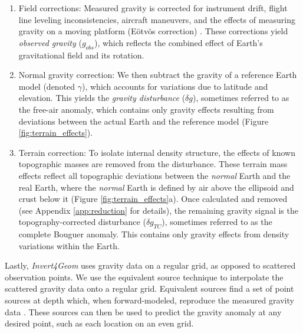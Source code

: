\documentclass[tc, manuscript]{copernicus}
\begin{document}
\begin{enumerate}
    \item Field corrections: Measured gravity is corrected for instrument drift, flight line leveling inconsistencies, aircraft maneuvers, and the effects of measuring gravity on a moving platform (E\"{o}tv\"{o}s correction) \citep{hinzenew2005, hinzegravity2013}. These corrections yield \textit{observed gravity} ($g_{obs}$), which reflects the combined effect of Earth's gravitational field and its rotation.
    \item Normal gravity correction: We then subtract the gravity of a reference Earth model (denoted $\gamma$), which accounts for variations due to latitude and elevation. This yields the \textit{gravity disturbance} ($\delta g$), sometimes referred to as the free-air anomaly, which contains only gravity effects resulting from deviations between the actual Earth and the reference model (Figure \ref{fig:terrain_effects}).
    \item Terrain correction: To isolate internal density structure, the effects of known topographic masses are removed from the disturbance. These terrain mass effects reflect all topographic deviations between the \textit{normal} Earth and the real Earth, where the \textit{normal} Earth is defined by air above the ellipsoid and crust below it (Figure \ref{fig:terrain_effects}a). Once calculated and removed (see Appendix \ref{app:reduction} for details), the remaining gravity signal is the topography-corrected disturbance ($\delta g_{TC}$), sometimes referred to as the complete Bouguer anomaly. This contains only gravity effects from density variations within the Earth.
\end{enumerate}

Lastly, \textit{Invert4Geom} uses gravity data on a regular grid, as opposed to scattered observation points. We use the equivalent source technique to interpolate the scattered gravity data onto a regular grid. Equivalent sources find a set of point sources at depth which, when forward-modeled, reproduce the measured gravity data \citep{solergradientboosted2021, dampneyequivalent1969}. These sources can then be used to predict the gravity anomaly at any desired point, such as each location on an even grid.
\end{document}

